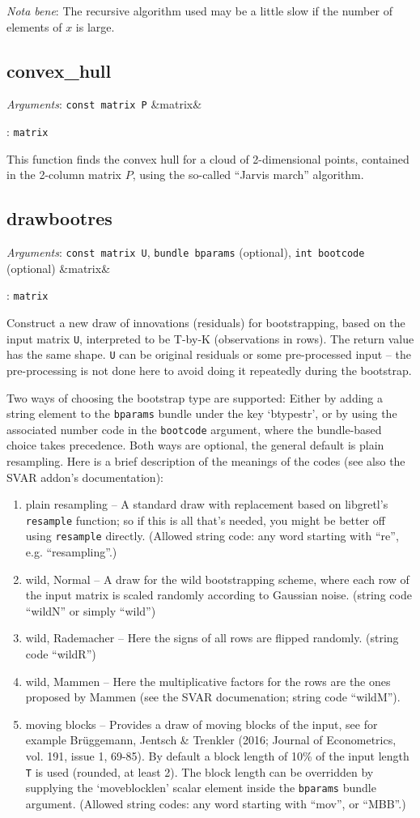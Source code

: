 \documentclass[11pt,english]{article}
\newcommand{\ArgRet}[2]{%
  {\it Arguments}: {#1}%
  \ifx&#2&%
  \else
  \par\smallskip\noindent {\it Return type}: \texttt{#2}
  \fi%
  \par\medskip\par%
  }
\begin{document}
\emph{Nota bene}: The recursive algorithm used may be a little slow if
the number of elements of $x$ is large.

\subsection{convex\_hull}
\ArgRet{\texttt{const matrix P}}{matrix} This function finds the
convex hull for a cloud of 2-dimensional points, contained in the
2-column matrix $P$, using the so-called ``Jarvis march'' algorithm.


\subsection{drawbootres}

\ArgRet{\texttt{const matrix U}, \texttt{bundle bparams} (optional),
  \texttt{int bootcode} (optional)}{matrix} Construct a new draw of
innovations (residuals) for bootstrapping, based on the input matrix
\texttt{U}, interpreted to be T-by-K (observations in rows). The
return value has the same shape. \texttt{U} can be original residuals
or some pre-processed input -- the pre-processing is not done here to
avoid doing it repeatedly during the bootstrap.

Two ways of choosing the bootstrap type are supported: Either by
adding a string element to the \texttt{bparams} bundle under the key
`btypestr', or by using the associated number code in the
\texttt{bootcode} argument, where the bundle-based choice takes
precedence. Both ways are optional, the general default is plain
resampling. Here is a brief description of the meanings of the codes
(see also the SVAR addon's documentation):

\begin{enumerate}
\item plain resampling -- A standard draw with replacement based on
  libgretl's \texttt{resample} function; so if this is all that's
  needed, you might be better off using \texttt{resample}
  directly. (Allowed string code: any word starting with ``re'',
  e.g. ``resampling''.)
\item wild, Normal -- A draw for the wild bootstrapping scheme, where
  each row of the input matrix is scaled randomly according to
  Gaussian noise.  (string code ``wildN'' or simply ``wild'')
\item wild, Rademacher -- Here the signs of all rows are flipped
  randomly.  (string code ``wildR'')
\item wild, Mammen -- Here the multiplicative factors for the rows are
  the ones proposed by Mammen (see the SVAR documenation; string code
  ``wildM'').
\item moving blocks -- Provides a draw of moving blocks of the input,
  see for example Brüggemann, Jentsch \& Trenkler (2016; Journal of
  Econometrics, vol. 191, issue 1, 69-85). By default a block length
  of 10\% of the input length \texttt{T} is used (rounded, at least
  2). The block length can be overridden by supplying the
  `moveblocklen' scalar element inside the \texttt{bparams} bundle
  argument. (Allowed string codes: any word starting with ``mov'', or
  ``MBB''.)

\end{enumerate}
\end{document}
